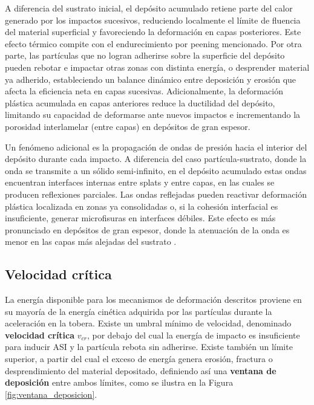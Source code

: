 A diferencia del sustrato inicial, el depósito acumulado retiene parte del 
calor generado por los impactos sucesivos, reduciendo localmente el límite de 
fluencia del material superficial y favoreciendo la deformación en capas 
posteriores\cite{Papyrin2007}. Este efecto térmico compite con el 
endurecimiento por peening mencionado. Por otra parte, las partículas que no logran adherirse sobre la superficie del 
depósito pueden rebotar e impactar otras zonas con distinta energía, o 
desprender material ya adherido, estableciendo un balance dinámico entre 
deposición y erosión que afecta la eficiencia neta en capas 
sucesivas\cite{Moridi2014}. Adicionalmente, la deformación plástica acumulada 
en capas anteriores reduce la ductilidad del depósito, limitando su 
capacidad de deformarse ante nuevos impactos e incrementando la porosidad 
interlamelar (entre capas) en depósitos de gran espesor\cite{Huang2020}.

Un fenómeno adicional es la propagación de ondas de presión hacia el interior del depósito durante cada impacto. A diferencia del caso partícula-sustrato, donde la onda se transmite a un sólido semi-infinito, en el depósito acumulado estas ondas encuentran interfaces internas entre splats y entre capas, en las cuales se producen reflexiones parciales. Las ondas reflejadas pueden reactivar deformación plástica localizada en zonas ya consolidadas o, si la cohesión interfacial es insuficiente, generar microfisuras en interfaces débiles. Este efecto es más pronunciado en depósitos de gran espesor, donde la atenuación de la onda es menor en las capas más alejadas del sustrato \cite{Schmidt2006}.

\subsection{Velocidad crítica}

La energía disponible para los mecanismos de deformación descritos 
proviene en su mayoría de la energía cinética adquirida por las partículas durante 
la aceleración en la tobera. Existe un umbral mínimo de velocidad, 
denominado \textbf{velocidad crítica} $v_{cr}$, por debajo del cual 
la energía de impacto es insuficiente para inducir ASI y la partícula 
rebota sin adherirse. Existe también un límite superior, a partir del 
cual el exceso de energía genera erosión, fractura o desprendimiento 
del material depositado, definiendo así una \textbf{ventana de 
	deposición} entre ambos límites, como se ilustra en la 
Figura \ref{fig:ventana_deposicion}.

